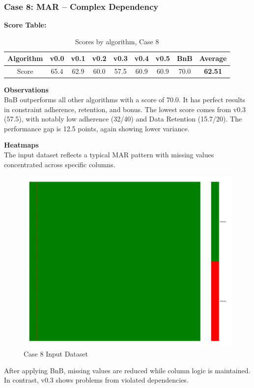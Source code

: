 \documentclass[a4paper,12pt]{article}
\begin{document}
\subsubsection{Case 8: MAR – Complex Dependency}

\textbf{Score Table:}

\begin{table}[H]
\centering
\caption{Scores by algorithm, Case 8}
\label{tab:score_algorithms_case8}
\begin{tabular}{|c|c|c|c|c|c|c|c|c|}
\hline
Algorithm & v0.0 & v0.1 & v0.2 & v0.3 & v0.4 & v0.5 & BnB & Average \\
\hline
Score & 65.4 & 62.9 & 60.0 & 57.5 & 60.9 & 60.9 & 70.0 & \textbf{62.51} \\
\hline
\end{tabular}
\end{table}

\textbf{Observations}\\
BnB outperforms all other algorithms with a score of 70.0. It has perfect results in constraint adherence, retention, and bonus. The lowest score comes from v0.3 (57.5), with notably low adherence (32/40) and Data Retention (15.7/20). The performance gap is 12.5 points, again showing lower variance. 

\textbf{Heatmaps}\\
The input dataset reflects a typical MAR pattern with missing values concentrated across specific columns.

\begin{figure}[H]
    \centering
    \includegraphics[width=0.5\linewidth]{case9_heatmap_erased.png}
    \caption{Case 8 Input Dataset}
\end{figure}

After applying BnB, missing values are reduced while column logic is maintained. In contrast, v0.3 shows problems from violated dependencies.
\end{document}
